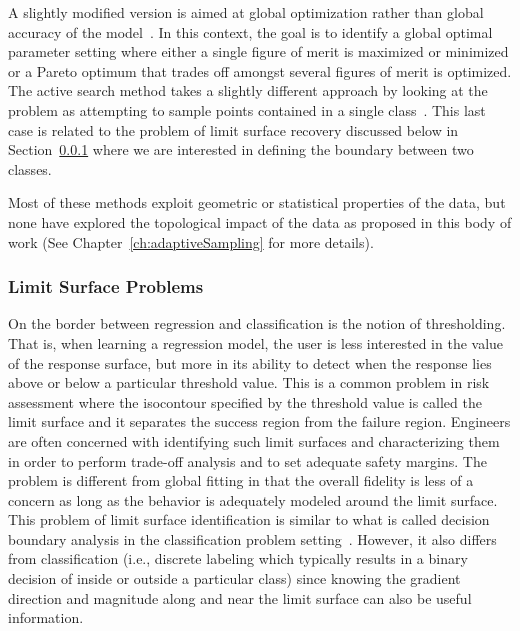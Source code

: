 A slightly modified version is aimed at global optimization rather than global accuracy of the model~\cite{MooreSchneider1996,JonesSchonlauWelch1998}.
%
In this context, the goal is to identify a global optimal parameter setting where either a single figure of merit is maximized or minimized or a Pareto optimum that trades off amongst several figures of merit is optimized.
%
The active search method takes a slightly different approach by looking at the problem as attempting to sample points contained in a single class~\cite{GarnettKrishnamurthyXiong2012}.
%
This last case is related to the problem of limit surface recovery discussed below in Section~\ref{sec:limitSurface} where we are interested in defining the boundary between two classes.

Most of these methods exploit geometric or statistical properties of the data, but none have explored the topological impact of the data as proposed in this body of work (See Chapter~\ref{ch:adaptiveSampling} for more details).

\subsubsection{Limit Surface Problems}
\label{sec:limitSurface}

On the border between regression and classification is the notion of thresholding.
%
That is, when learning a regression model, the user is less interested in the value of the response surface, but more in its ability to detect when the response lies above or below a particular threshold value.
%
This is a common problem in risk assessment where the isocontour specified by the threshold value is called the limit surface and it separates the success region from the failure region.
%
Engineers are often concerned with identifying such limit surfaces and characterizing them in order to perform trade-off analysis and to set adequate safety margins.
%
The problem is different from global fitting in that the overall fidelity is less of a concern as long as the behavior is adequately modeled around the limit surface.
%
This problem of limit surface identification is similar to what is called decision boundary analysis in the classification problem setting~\cite{DiamantiniPotena2007,GoLee2003,LeeLandgrebe1993,LeeLandgrebe1997,WooLee2017,ZhangLiu2005}.
%
However, it also differs from classification (i.e., discrete labeling which typically results in a binary decision of inside or outside a particular class) since knowing the gradient direction and magnitude along and near the limit surface can also be useful information.

